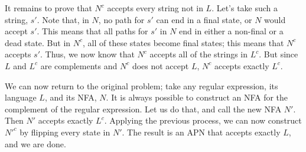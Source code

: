 \documentclass[solution, letterpaper]{cs121}
\begin{document}
\begin{solution}
It remains to prove that $N^c$ accepts every string not in $L$.  Let's take such a string, $s'$.  Note that, in $N$, no path for $s'$ can end in a final state, or $N$ would accept $s'$.  This means that all paths for $s'$ in $N$ end in either a non-final or a dead state.  But in $N^c$, all of these states become final states; this means that $N^c$ accepts $s'$.  Thus, we now know that $N^c$ accepts all of the strings in $L^c$.  But since $L$ and $L^c$ are complements and $N^c$ does not accept $L$, $N^c$ accepts exactly $L^c$.

We can now return to the original problem; take any regular expression, its language $L$, and its NFA, $N$.  It is always possible to construct an NFA for the complement of the regular expression.  Let us do that, and call the new NFA $N'$.  Then $N'$ accepts exactly $L^c$.  Applying the previous process, we can now construct $N'^c$ by flipping every state in $N'$.  The result is an APN that accepts exactly $L$, and we are done.

\end{solution}
\end{document}
